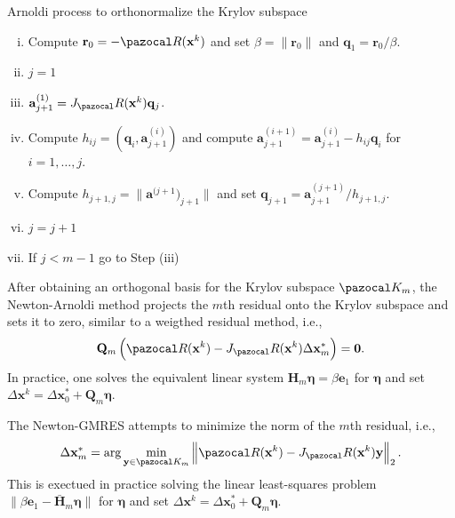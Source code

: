 \begin{framedbox}[htbp]
  \caption{Arnoldi process to orthonormalize the Krylov subspace}
  \label{box:arnoldi_process}
  \begin{center}
    \begin{minipage}{0.9\textwidth}
    \begin{enumerate}[(i)]
      \item Compute \(\mathbf r_0 = -\pazocal R(\mathbf x^k)\) and set \(\beta = \|\mathbf r_0\|\) and \(\mathbf q_1 = \mathbf r_0/\beta\).
      \item \(j=1\)
      \item \(\mathbf a^{(1)}_{j+1} = J_\pazocal R(\mathbf x^k) \mathbf q_j\).
      \item Compute \(h_{ij}=(\mathbf q_i, \mathbf a^{(i)}_{j+1})\) and compute \(\mathbf a^{(i+1)}_{j+1} = \mathbf a^{(i)}_{j+1} - h_{ij} \mathbf q_i\) for \(i=1,\dots,j\).
      \item Compute \(h_{j+1,j}=\|\mathbf a^{(j+1})_{j+1}\|\) and set \(\mathbf q_{j+1} = \mathbf a^{(j+1)}_{j+1}/h_{j+1,j}\).
      \item \(j=j+1\)
      \item If \(j<m-1\) go to Step (iii)
    \end{enumerate}
    \end{minipage}
  \end{center}
\end{framedbox}

After obtaining an orthogonal basis for the Krylov subspace \(\pazocal K_m\), the Newton-Arnoldi method projects the \(m\)th residual onto the Krylov subspace and sets it to zero, similar to a weigthed residual method, i.e.,
\begin{equation}
  \mathbf Q_m \left(\pazocal R(\mathbf x^k) - J_\pazocal R(\mathbf x^k)\Delta \mathbf x^*_m\right) = \mathbf 0.
\end{equation}
In practice, one solves the equivalent linear system \(\mathbf H_m \boldsymbol{\eta} = \beta \mathbf e_1\) for \(\boldsymbol{\eta}\) and set \(\Delta \mathbf x^k  =\Delta \mathbf x^*_0 + \mathbf Q_m\boldsymbol \eta\).

The Newton-GMRES attempts to minimize the norm of the \(m\)th residual, i.e.,
\begin{equation}
  \Delta \mathbf x^*_m = \arg\min_{\mathbf y\in \pazocal K_m} \left\|\pazocal R(\mathbf x^k) - J_\pazocal R(\mathbf x^k)\mathbf y\right\|_2.
\end{equation}
This is exectued in practice solving the linear least-squares problem \(\|\beta\mathbf e_1 -\bar{\mathbf H}_m \boldsymbol{\eta}\|\) for \(\boldsymbol{\eta}\) and set \(\Delta \mathbf x^k  =\Delta \mathbf x^*_0 + \mathbf Q_m\boldsymbol \eta\).

